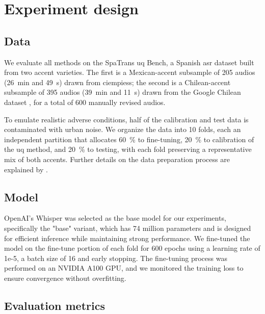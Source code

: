 \documentclass[runningheads]{llncs}
\begin{document}
\section{Experiment design}

\subsection{Data}

We evaluate all methods on the SpaTrans \acrshort{uq} Bench, a Spanish \acrshort{asr} dataset built from two accent varieties. The first is a Mexican-accent subsample of 205 audios (\qty{26}{\minute} and \qty{49}{\second}) drawn from \acrfull{ciempiess}\cite{hernandez2017automatic}; the second is a Chilean-accent subsample of 395 audios (\qty{39}{\minute} and \qty{11}{\second}) drawn from the Google Chilean dataset \cite{guevara-rukoz-etal-2020-crowdsourcing}, for a total of 600 manually revised audios.

To emulate realistic adverse conditions, half of the calibration and test data is contaminated with urban noise. We organize the data into 10 folds, each an independent partition that allocates \qty{60}{\percent} to fine-tuning, \qty{20}{\percent} to calibration of the \acrshort{uq} method, and \qty{20}{\percent} to testing, with each fold preserving a representative mix of both accents. Further details on the data preparation process are explained by \cite{rodriguez2024uncertainty}.

\subsection{Model}

OpenAI's Whisper \cite{radford2023robust} was selected as the base model for our experiments, specifically the "base" variant, which has 74 million parameters and is designed for efficient inference while maintaining strong performance. We fine-tuned the model on the fine-tune portion of each fold for 600 epochs using a learning rate of 1e-5, a batch size of 16 and early stopping. The fine-tuning process was performed on an NVIDIA A100 GPU, and we monitored the training loss to ensure convergence without overfitting.

\subsection{Evaluation metrics}
\end{document}
